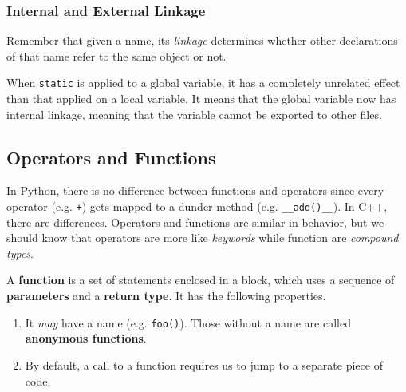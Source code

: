 \documentclass{article}
\begin{document}
    \subsubsection{Internal and External Linkage} 

      Remember that given a name, its \textit{linkage} determines whether other declarations of that name refer to the same object or not. 

      \begin{definition}
        When \texttt{static} is applied to a global variable, it has a completely unrelated effect than that applied on a local variable. It means that the global variable now has internal linkage, meaning that the variable cannot be exported to other files. 
      \end{definition}

  \subsection{Operators and Functions} 

    In Python, there is no difference between functions and operators since every operator (e.g. \texttt{+}) gets mapped to a dunder method (e.g. \texttt{\_\_add()\_\_}). In C++, there are differences. Operators and functions are similar in behavior, but we should know that operators are more like \textit{keywords} while function are \textit{compound types}. 
    
    \begin{definition}[Function]
      A \textbf{function} is a set of statements enclosed in a block, which uses a sequence of \textbf{parameters} and a \textbf{return type}. It has the following properties. 
      \begin{enumerate}
        \item It \textit{may} have a name (e.g. \texttt{foo()}). Those without a name are called \textbf{anonymous functions}. 
        \item By default, a call to a function requires us to jump to a separate piece of code. 
      \end{enumerate}
    \end{definition}
\end{document}
